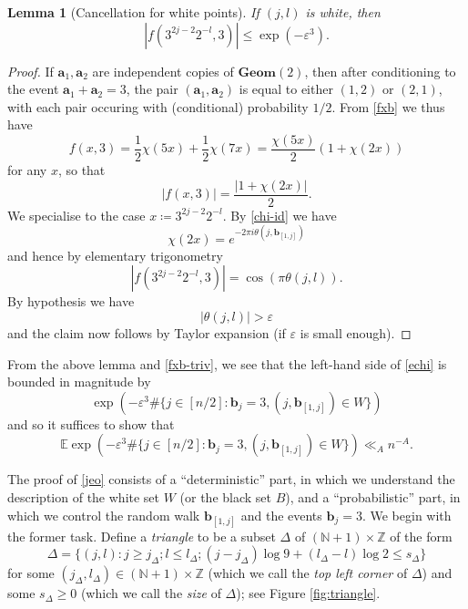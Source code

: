 \documentclass[12pt,a4paper,reqno]{amsart}
\numberwithin{equation}{section}
\theoremstyle{plain}
\newtheorem{lemma}[theorem]{Lemma}
\theoremstyle{definition}
\newcommand\E{\mathbb{E}}
\newcommand\Z{\mathbb{Z}}
\newcommand\N{\mathbb{N}}
\renewcommand\a{\mathbf{a}}
\renewcommand\b{\mathbf{b}}
\newcommand\Geom{\mathbf{Geom}}
\newcommand\eps{\varepsilon}
\begin{document}
\begin{lemma}[Cancellation for white points]  If $(j,l)$ is white, then 
$$|f(3^{2j-2} 2^{-l},3)| \leq \exp( -\eps^3 ).$$
\end{lemma}

\begin{proof}  
If $\a_1,\a_2$ are independent copies of $\Geom(2)$, then after conditioning to the event $\a_1+\a_2 = 3$, the pair $(\a_1,\a_2)$ is equal to either $(1,2)$ or $(2,1)$, with each pair occuring with (conditional) probability $1/2$.  From \eqref{fxb} we thus have
$$ f(x,3) = \frac{1}{2} \chi( 5 x ) + \frac{1}{2} \chi( 7 x ) = \frac{\chi(5x)}{2} (1 + \chi(2x))$$
for any $x$, so that
$$ |f(x,3)| = \frac{|1 + \chi(2x)|}{2}.$$
We specialise to the case $x \coloneqq 3^{2j-2} 2^{-l}$.  By \eqref{chi-id} we have
$$  \chi(2x) = e^{-2\pi i \theta(j, \b_{[1,j]})} $$
and hence by elementary trigonometry
$$ |f(3^{2j-2} 2^{-l},3)| = \cos( \pi \theta(j, l) ).$$
By hypothesis we have
$$
 |\theta(j, l)| > \eps
$$
and the claim now follows by Taylor expansion (if $\eps$ is small enough).
\end{proof}

From the above lemma and \eqref{fxb-triv}, we see that the left-hand side of \eqref{echi} is bounded in magnitude by
$$ \exp( - \eps^3 \# \{ j \in [n/2]: \b_j = 3, (j,\b_{[1,j]}) \in W \} )$$
and so it suffices to show that
\begin{equation}\label{jeo}
\E \exp( - \eps^3 \# \{ j \in [n/2]: \b_j = 3, (j,\b_{[1,j]}) \in W \} ) \ll_A n^{-A}.
\end{equation}

The proof of \eqref{jeo} consists of a ``deterministic'' part, in which we understand the description of the white set $W$ (or the black set $B$), and a ``probabilistic'' part, in which we control the random walk $\b_{[1,j]}$ and the events $\b_j=3$.  We begin with the former task.  Define a \emph{triangle} to be a subset $\Delta$ of $(\N+1) \times \Z$ of the form
\begin{equation}\label{ts}
 \Delta = \{ (j,l): j \geq j_\Delta; l \leq l_\Delta; (j-j_\Delta) \log 9 + (l_\Delta-l) \log 2 \leq s_\Delta \}
\end{equation}
for some $(j_\Delta, l_\Delta) \in (\N+1) \times \Z$ (which we call the \emph{top left corner} of $\Delta$) and some $s_\Delta \geq 0$ (which we call the \emph{size} of $\Delta$); see Figure \ref{fig:triangle}.
\end{document}
